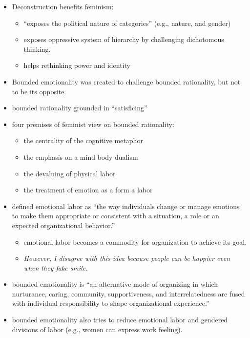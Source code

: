 \documentclass[
]{book}
\begin{document}
\begin{itemize}
\item
  Deconstruction benefits feminism:

  \begin{itemize}
  \item
    ``exposes the political nature of categories'' (e.g., nature, and gender)
  \item
    exposes oppressive system of hierarchy by challenging dichotomous thinking.
  \item
    helps rethinking power and identity
  \end{itemize}
\item
  Bounded emotionality was created to challenge bounded rationality, but not to be its opposite.
\item
  bounded rationality grounded in ``satisficing''
\item
  four premises of feminist view on bounded rationality:

  \begin{itemize}
  \item
    the centrality of the cognitive metaphor
  \item
    the emphasis on a mind-body dualism
  \item
    the devaluing of physical labor
  \item
    the treatment of emotion as a form a labor
  \end{itemize}
\item
  \citep{hochschild2012} defined emotional labor as ``the way individuals change or manage emotions to make them appropriate
  or consistent with a situation, a role or an expected organizational behavior.''

  \begin{itemize}
  \item
    emotional labor becomes a commodity for organization to achieve its goal.
  \item
    \emph{However, I disagree with this idea because people can be happier even when they fake smile.}
  \end{itemize}
\item
  bounded emotionality is ``an alternative mode of organizing in which nurturance, caring, community, supportiveness,
  and interrelatedness are fused with individual responsibility to shape organizational experience.''
\item
  bounded emotionality also tries to reduce emotional labor and gendered divisions of labor (e.g., women can express
  work feeling).
\end{itemize}
\end{document}
